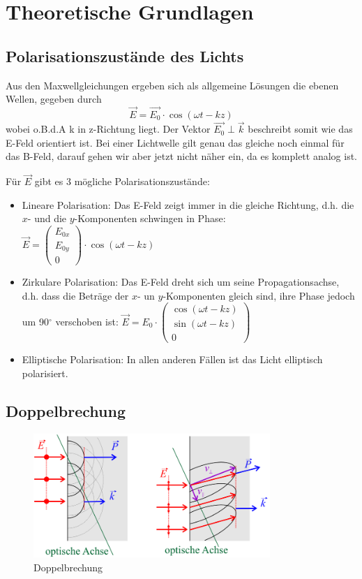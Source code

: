 \section{Theoretische Grundlagen}

\subsection{Polarisationszustände des Lichts}

Aus den Maxwellgleichungen ergeben sich als allgemeine Lösungen die ebenen Wellen, gegeben durch
$$\vec E = \vec{E_0}\cdot \cos(\omega t - kz)$$
wobei o.B.d.A k in z-Richtung liegt. Der Vektor $\vec{E_0} \perp \vec k$ beschreibt somit wie das E-Feld orientiert ist. Bei einer Lichtwelle gilt genau das gleiche noch einmal für das B-Feld, darauf gehen wir aber jetzt nicht näher ein, da es komplett analog ist.

Für $\vec{E}$ gibt es 3 mögliche Polarisationszustände:

\begin{itemize}

\item Lineare Polarisation: Das E-Feld zeigt immer in die gleiche Richtung, d.h. die $x$- und die $y$-Komponenten schwingen in Phase:
$ \vec{E} = \begin{pmatrix} E_{0x} \\ E_{0y} \\ 0 \end{pmatrix}\cdot\cos(\omega t-kz) $

\item Zirkulare Polarisation: Das E-Feld dreht sich um seine Propagationsachse, d.h. dass die Beträge der $x$- un $y$-Komponenten gleich sind, ihre Phase jedoch um 90$^\circ$ verschoben ist:
$\vec{E}= E_0\cdot \begin{pmatrix} \cos(\omega t - kz) \\ \sin(\omega t - kz) \\ 0 \end{pmatrix}$

\item Elliptische Polarisation: In allen anderen Fällen ist das Licht elliptisch polarisiert.
\end{itemize}


\subsection{Doppelbrechung}

\begin{figure}[H]
	\centering \includegraphics[width = 0.8\textwidth]{Bilder/Doppelbrechung.jpg}
	\caption{Doppelbrechung}
\end{figure}

